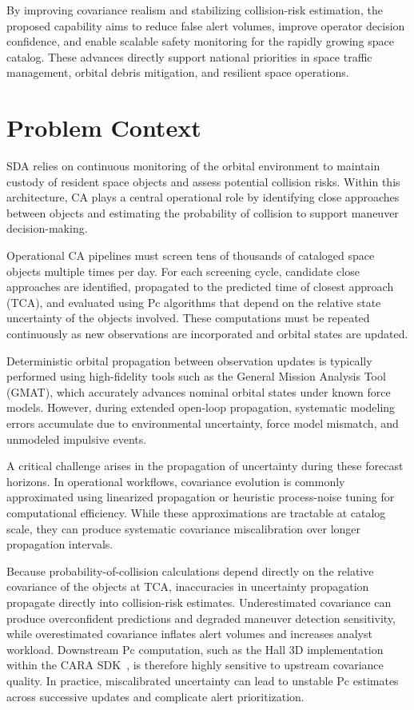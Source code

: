 \documentclass[10pt]{article}
\begin{document}
By improving covariance realism and stabilizing collision-risk estimation, the proposed capability aims to reduce false alert volumes, improve operator decision confidence, and enable scalable safety monitoring for the rapidly growing space catalog. These advances directly support national priorities in space traffic management, orbital debris mitigation, and resilient space operations.

\section{Problem Context}

SDA relies on continuous monitoring of the orbital environment to maintain custody of resident space objects and assess potential collision risks. Within this architecture, CA plays a central operational role by identifying close approaches between objects and estimating the probability of collision to support maneuver decision-making.

Operational CA pipelines must screen tens of thousands of cataloged space objects multiple times per day. For each screening cycle, candidate close approaches are identified, propagated to the predicted time of closest approach (TCA), and evaluated using Pc algorithms that depend on the relative state uncertainty of the objects involved. These computations must be repeated continuously as new observations are incorporated and orbital states are updated.

Deterministic orbital propagation between observation updates is typically performed using high-fidelity tools such as the General Mission Analysis Tool (GMAT), which accurately advances nominal orbital states under known force models. However, during extended open-loop propagation, systematic modeling errors accumulate due to environmental uncertainty, force model mismatch, and unmodeled impulsive events.

A critical challenge arises in the propagation of uncertainty during these forecast horizons. In operational workflows, covariance evolution is commonly approximated using linearized propagation or heuristic process-noise tuning for computational efficiency. While these approximations are tractable at catalog scale, they can produce systematic covariance miscalibration over longer propagation intervals.

Because probability-of-collision calculations depend directly on the relative covariance of the objects at TCA, inaccuracies in uncertainty propagation propagate directly into collision-risk estimates. Underestimated covariance can produce overconfident predictions and degraded maneuver detection sensitivity, while overestimated covariance inflates alert volumes and increases analyst workload. Downstream Pc computation, such as the Hall 3D implementation within the CARA SDK~\cite{hall2021_3dnc, hall2023_pcmultistep, cara_sdk_multistep}, is therefore highly sensitive to upstream covariance quality. In practice, miscalibrated uncertainty can lead to unstable Pc estimates across successive updates and complicate alert prioritization.
\end{document}
